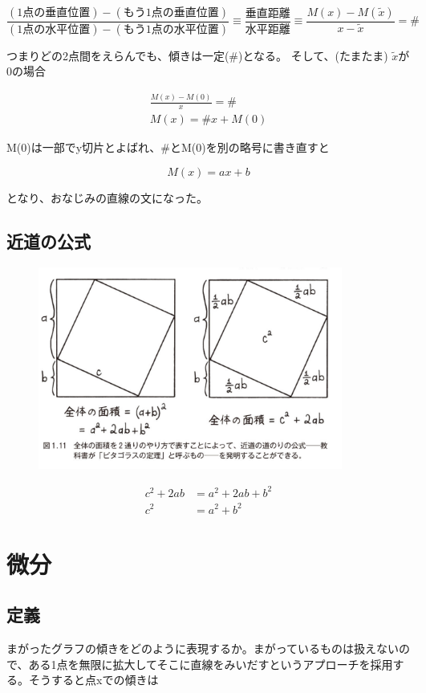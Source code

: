 \documentclass[dvipdfmx]{jsarticle}
\begin{document}
\[ \frac{(1点の垂直位置) - (もう1点の垂直位置)}{(1点の水平位置) - (もう1点の水平位置)} \equiv \frac{垂直距離}{水平距離} \equiv \frac{M(x) - M(\tilde{x})}{x - \tilde{x}}  = \# \]

つまりどの2点間をえらんでも、傾きは一定(\#)となる。 そして、(たまたま) $\tilde{x}$が0の場合

\begin{align*}
  \frac{M(x) - M(0)}{x} = \# \\
  M(x) = \#x + M(0)
\end{align*}

M(0)は一部でy切片とよばれ、\#とM(0)を別の略号に書き直すと

\[ M(x) = ax + b \]

となり、おなじみの直線の文になった。

\subsection{近道の公式}

\begin{figure}
  \centering
  \includegraphics[width=10cm]{images/burn_math_1-11.png}
\end{figure}

\begin{align*}
  c^2 + 2ab &= a^2 + 2ab + b^2 \\
  c^2 &= a^2 + b^2
\end{align*}

\section{微分}

\subsection{定義}
まがったグラフの傾きをどのように表現するか。まがっているものは扱えないので、ある1点を無限に拡大してそこに直線をみいだすというアプローチを採用する。そうすると点xでの傾きは
\end{document}
